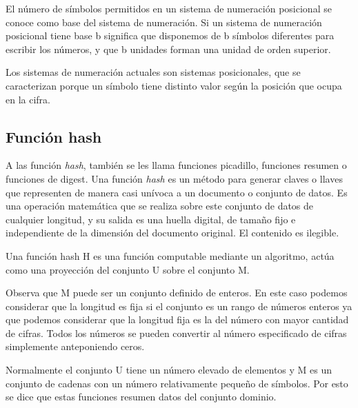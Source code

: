 El número de símbolos permitidos en un sistema de numeración posicional se conoce como base del sistema de numeración. Si un sistema de numeración posicional tiene base b significa que disponemos de b símbolos diferentes para escribir los números, y que b unidades forman una unidad de orden superior.

Los sistemas de numeración actuales son sistemas posicionales, que se caracterizan porque un símbolo tiene distinto valor según la posición que ocupa en la cifra.


\subsection{Función hash}
A las función \emph{hash}, también se les llama funciones picadillo, funciones resumen o funciones de digest. Una función \emph{hash} es un método para generar claves o llaves que representen de manera casi unívoca a un documento o conjunto de datos. Es una operación matemática que se realiza sobre este conjunto de datos de cualquier longitud, y su salida es una huella digital, de tamaño fijo e independiente de la dimensión del documento original. El contenido es ilegible.

Una función hash H es una función computable mediante un algoritmo, actúa como una proyección del conjunto U sobre el conjunto M.

Observa que M puede ser un conjunto definido de enteros. En este caso podemos considerar que la longitud es fija si el conjunto es un rango de números enteros ya que podemos considerar que la longitud fija es la del número con mayor cantidad de cifras. Todos los números se pueden convertir al número especificado de cifras simplemente anteponiendo ceros.

Normalmente el conjunto U tiene un número elevado de elementos y M es un conjunto de cadenas con un número relativamente pequeño de símbolos. Por esto se dice que estas funciones resumen datos del conjunto dominio.

